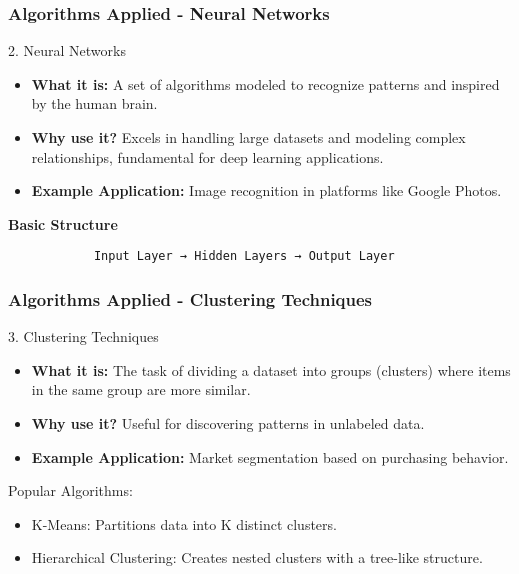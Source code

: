 \documentclass[aspectratio=169]{beamer}
\begin{document}
\begin{frame}[fragile]
    \frametitle{Algorithms Applied - Neural Networks}
    \begin{block}{2. Neural Networks}
        \begin{itemize}
            \item \textbf{What it is:} A set of algorithms modeled to recognize patterns and inspired by the human brain.
            \item \textbf{Why use it?} Excels in handling large datasets and modeling complex relationships, fundamental for deep learning applications.
            \item \textbf{Example Application:} Image recognition in platforms like Google Photos.
        \end{itemize}
        \begin{center}
            \textbf{Basic Structure}
            \begin{lstlisting}
            Input Layer → Hidden Layers → Output Layer
            \end{lstlisting}
        \end{center}
    \end{block}
\end{frame}

\begin{frame}[fragile]
    \frametitle{Algorithms Applied - Clustering Techniques}
    \begin{block}{3. Clustering Techniques}
        \begin{itemize}
            \item \textbf{What it is:} The task of dividing a dataset into groups (clusters) where items in the same group are more similar.
            \item \textbf{Why use it?} Useful for discovering patterns in unlabeled data.
            \item \textbf{Example Application:} Market segmentation based on purchasing behavior.
        \end{itemize}
        \begin{block}{Popular Algorithms:}
            \begin{itemize}
                \item K-Means: Partitions data into K distinct clusters.
                \item Hierarchical Clustering: Creates nested clusters with a tree-like structure.
            \end{itemize}
        \end{block}
    \end{block}
\end{frame}
\end{document}

